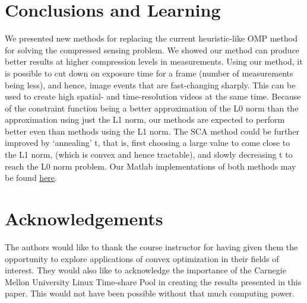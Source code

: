 \documentclass[letterpaper, 10 pt, conference]{article}
\begin{document}
\section{Conclusions and Learning}
We presented new methods for replacing the current heuristic-like OMP method for solving the compressed sensing problem. We showed our method can produce better results at higher compression levels in measurements. Using our method, it is possible to cut down on exposure time for a frame (number of measurements being less), and hence, image events that are fast-changing sharply. This can be used to create high spatial- and time-resolution videos at the same time. Because of the constraint function being a better approximation of the L0 norm than the approximation using just the L1 norm, our methods are expected to perform better even than methods using the L1 norm. The SCA method could be further improved by `annealing' t, that is, first choosing a large value to come close to the L1 norm, (which is convex and hence tractable), and slowly decreasing t to reach the L0 norm problem. Our Matlab implementations of both methods may be found \href{http://www.github.com/alankarkotwal/cs-rank-minimization}{here}.

\section{Acknowledgements}
The authors would like to thank the course instructor for having given them the opportunity to explore applications of convex optimization in their fields of interest. They would also like to acknowledge the importance of the Carnegie Mellon University Linux Time-share Pool in creating the results presented in this paper. This would not have been possible without that much computing power.
\end{document}
